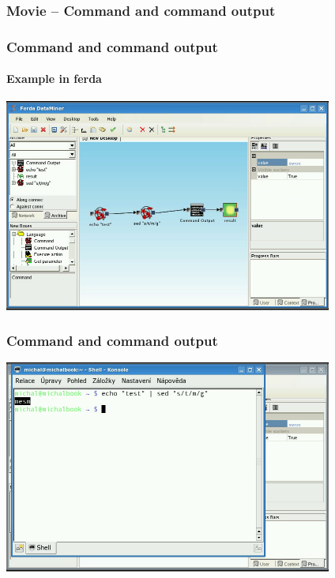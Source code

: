 \documentclass{beamer}
\begin{document}
\begin{frame}
	\frametitle{Movie -- Command and command output}
\end{frame}

\begin{frame}
	\frametitle{Command and command output}
	\framesubtitle{Example in ferda}
	\includegraphics[width=10.8cm]{command2.png}
\end{frame}

\begin{frame}
	\frametitle{Command and command output}
	\subtitle{The same in console}
	\includegraphics[width=10.8cm]{command3.png}
\end{frame}
\end{document}
